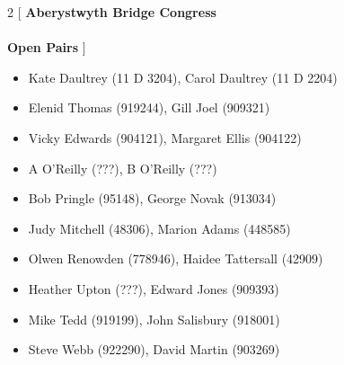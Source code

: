 \documentclass[11pt]{article}
\begin{document}
\begin{multicols}{2}
[
{\bf {\Large Aberystwyth Bridge Congress}}\\
\ \\
{\bf {\large Open Pairs}}
]

\begin{itemize}
\item Kate Daultrey (11 D 3204),
Carol Daultrey (11 D 2204)
\item Elenid Thomas (919244),
Gill Joel (909321)
\item Vicky Edwards (904121),
Margaret Ellis (904122)
\item A O'Reilly (???),
B O'Reilly (???)
\item Bob Pringle (95148),
George Novak (913034)
\item Judy Mitchell (48306),
Marion Adams (448585)
\item Olwen Renowden (778946),
Haidee Tattersall (42909)
\item Heather Upton (???),
Edward Jones (909393)
\item Mike Tedd (919199),
John Salisbury (918001)
\item Steve Webb (922290),
David Martin (903269)
\end{itemize}

\end{multicols}

\newpage
\end{document}
